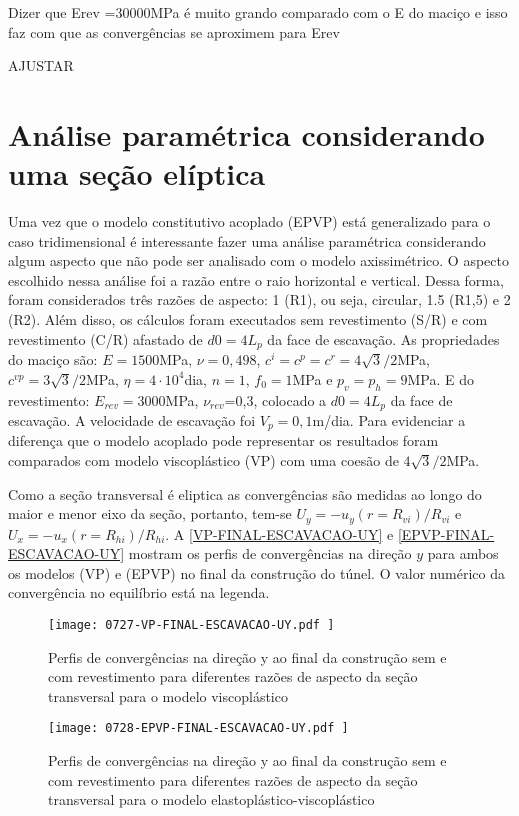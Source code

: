Dizer que Erev =30000MPa é muito grando comparado com o E do maciço e isso faz com que as convergências se aproximem para Erev

AJUSTAR


\section{Análise paramétrica considerando uma seção elíptica}

Uma vez que o modelo constitutivo acoplado (EPVP) está generalizado para o caso tridimensional é interessante fazer uma análise paramétrica considerando algum aspecto que não pode ser analisado com o modelo axissimétrico. O aspecto escolhido nessa análise foi a razão entre o raio horizontal e vertical. Dessa forma, foram considerados três razões de aspecto: 1 (R1), ou seja, circular, 1.5 (R1,5) e 2 (R2). Além disso, os cálculos foram executados sem revestimento (S/R) e com revestimento (C/R) afastado de $d0=4L_p$ da face de escavação. As propriedades do maciço são: $E=1500$MPa, $\nu=0,498$, $c^i=c^p=c^r =4\sqrt{3}/2$MPa, $c^{vp}=3\sqrt{3}/2$MPa, $\eta = 4 \cdot 10^4$dia, $n=1$, $f_0=1$MPa e $p_v=p_h=9$MPa. E do revestimento: $E_{rev}=3000$MPa, $\nu_{rev}$=0,3, colocado a $d0=4L_p$ da face de escavação. A velocidade de escavação foi $V_p=0,1$m/dia. Para evidenciar a diferença que o modelo acoplado pode representar os resultados foram comparados com modelo viscoplástico (VP) com uma coesão de $4\sqrt{3}/2$MPa.

Como a seção transversal é eliptica as convergências são medidas ao longo do maior e menor eixo da seção, portanto,  tem-se $U_y = -u_y(r=R_{vi})/R_{vi}$ e $U_x = -u_x(r=R_{hi})/R_{hi}$. A \autoref{VP-FINAL-ESCAVACAO-UY} e \autoref{EPVP-FINAL-ESCAVACAO-UY} mostram os perfis de convergências na direção $y$ para ambos os modelos (VP) e (EPVP) no final da construção do túnel. O valor numérico da convergência no equilíbrio está na legenda.

\begin{figure}[H]
	\begin{center}
		\texttt{[image: 0727-VP-FINAL-ESCAVACAO-UY.pdf
		]}
	\end{center}
	\caption{\label{VP-FINAL-ESCAVACAO-UY}Perfis de convergências na direção y ao final da construção sem e com revestimento para diferentes razões de aspecto da seção transversal para o modelo viscoplástico}
\end{figure}

\begin{figure}[H]
	\begin{center}
		\texttt{[image: 0728-EPVP-FINAL-ESCAVACAO-UY.pdf
		]}
	\end{center}
	\caption{\label{EPVP-FINAL-ESCAVACAO-UY}Perfis de convergências na direção y ao final da construção sem e com revestimento para diferentes razões de aspecto da seção transversal para o modelo elastoplástico-viscoplástico}
\end{figure}

